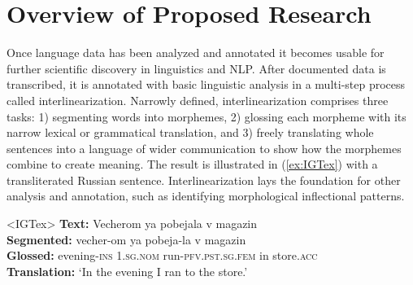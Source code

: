 \section{Overview of Proposed Research}

Once language data has been analyzed and annotated it becomes usable for further scientific discovery in linguistics and NLP. After documented data is transcribed, it is annotated with basic linguistic analysis in a multi-step process called interlinearization. Narrowly defined, interlinearization comprises three tasks: 1) segmenting words into morphemes, 2) glossing each morpheme with its narrow lexical or grammatical translation, and 3) freely translating whole sentences into a language of wider communication to show how the morphemes combine to create meaning. The result is illustrated in (\ref{ex:IGTex}) with a transliterated Russian sentence. Interlinearization lays the foundation for other analysis and annotation, such as identifying morphological inflectional patterns.  

\begin{singlespace}
\pex<IGTex>   
\label{ex:IGTex}
\textbf{Text:} \hspace{14 mm} Vecherom \hspace{4.75 mm} ya \hspace{13 mm} pobejala \hspace{21 mm} v \hspace{2 mm} magazin \\
\textbf{Segmented:} \hspace{2 mm} vecher-om \hspace{4 mm} ya \hspace{13 mm} pobeja-la \hspace{20 mm} v \hspace{2 mm} magazin \\
\textbf{Glossed:} \hspace{8.5 mm} evening-\textsc{ins} \hspace{1 mm} 1.\textsc{sg.nom} \hspace{1 mm} run-\textsc{pfv.pst.sg.fem} \hspace{1 mm} in \hspace{1 mm} store.\textsc{acc} \\
\textbf{Translation:} \hspace{1 mm} `In the evening I ran to the store.' \\
\xe
\end{singlespace}


